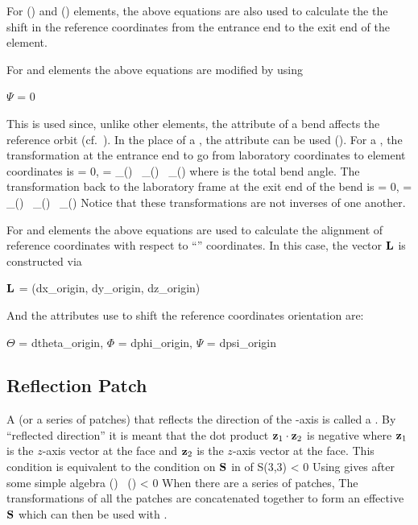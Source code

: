 For  () and  ()
elements, the above equations are also used to calculate the the shift
in the reference coordinates from the entrance end to the exit end of
the element.

For  and  elements the above equations are modified
by using 
\begin{example}
          \(\Psi\) = 0
\end{example}
This is used since, unlike other elements, the  attribute of
a bend affects the reference orbit (cf.~). In the place of a
, the  attribute can be used (). For
a , the transformation at the entrance end to go from laboratory
coordinates to element coordinates is
\Begineq
  \bfL = 0, \qquad 
  \bfS = \bfW_\Theta() \, \bfW_\Psi() \, \bfW_\Theta()
\Endeq
where  is the total bend angle.
The transformation back to the laboratory frame at the exit end of the bend is
\Begineq
  \bfL = 0, \qquad 
  \bfS = \bfW_\Theta() \, \bfW_\Psi() \, \bfW_\Theta()
\Endeq
Notice that these transformations are not inverses of one another.

For  and  elements the above equations are
used to calculate the alignment of reference coordinates with respect
to ``'' coordinates. In this case, the vector ${\bf L}$ is
constructed via
\begin{example}
          \({\bf L}\) = (dx_origin, dy_origin, dz_origin)
\end{example}
And the attributes use to shift the reference coordinates orientation are:
\begin{example}
          \(\Theta\) = dtheta_origin,  \(\Phi\) = dphi_origin,  \(\Psi\) = dpsi_origin
\end{example} 

\subsection{Reflection Patch}
\label{s:reflect.patch}

A  (or a series of patches) that reflects the direction of
the -axis is called a  . By ``reflected
direction'' it is meant that the dot product ${\bf z}_1 \cdot {\bf z}_2$ is
negative where ${\bf z}_1$ is the $z$-axis vector at the 
face and ${\bf z}_2$ is the $z$-axis vector at the  face. This
condition is equivalent to the condition on ${\bf S}$ in  of
\Begineq
  S(3,3) < 0
  \label{s330}
\Endeq
Using  gives after some simple algebra
\Begineq
  \cos() \, \cos() < 0
\Endeq
When there are a series of patches, The transformations of all the
patches are concatenated together to form an effective ${\bf S}$ which
can then be used with .


